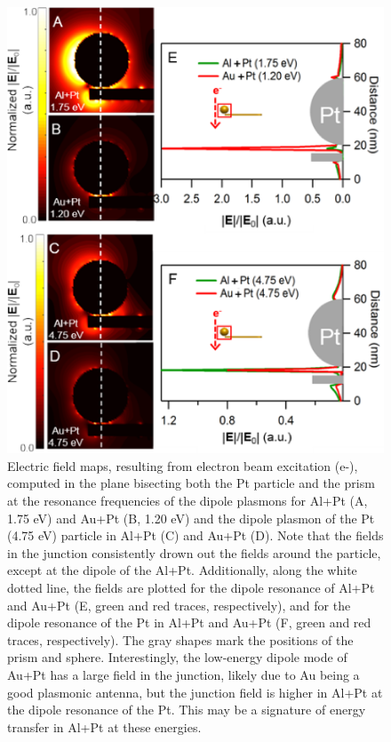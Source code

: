 \documentclass [11pt, proquest] {uwthesis}[2016/11/22]
\begin{document}
\begin{figure}
\includegraphics{prisms_fields_2.png}
\caption{Electric field maps, resulting from electron beam excitation (e-), computed in the plane bisecting both the Pt particle and the prism at the resonance frequencies of the dipole plasmons for Al+Pt (A, 1.75 eV) and Au+Pt (B, 1.20 eV) and the dipole plasmon of the Pt (4.75 eV) particle in Al+Pt (C) and Au+Pt (D). Note that the fields in the junction consistently drown out the fields around the particle, except at the dipole of the Al+Pt.
Additionally, along the white dotted line, the fields are plotted for the dipole resonance of Al+Pt and Au+Pt (E, green and red traces, respectively), and for the dipole resonance of the Pt in Al+Pt and Au+Pt (F, green and red traces, respectively). The gray shapes mark the positions of the prism and sphere. Interestingly, the low-energy dipole mode of Au+Pt has a large field in the junction, likely due to Au being a good plasmonic antenna, but the junction field is higher in Al+Pt at the dipole resonance of the Pt. This may be a signature of energy transfer in Al+Pt at these energies.}
\label{field_side}
\end{figure}
\end{document}
